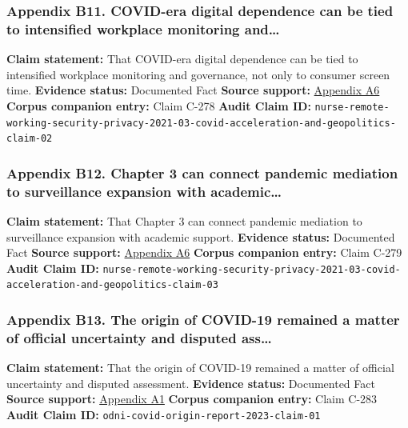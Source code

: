 \documentclass[
  american,
  11pt,
  letterpaper,
]{article}
\begin{document}
\subsubsection{Appendix B11. COVID-era digital dependence can be tied to
intensified workplace monitoring
and\ldots{}}\label{ch-03-appendix-b11-covid-era-digital-dependence-can-be-tied-to-intensified-workplace-monitoring-and}

\textbf{Claim statement:} That COVID-era digital dependence can be tied
to intensified workplace monitoring and governance, not only to consumer
screen time. \textbf{Evidence status:} Documented Fact \textbf{Source
support:}
\hyperref[ch-03-appendix-a6-remote-working-pre-and-post-covid-19-an-analysis-of-new-threats-and-risks-to-security-and-privacy]{Appendix
A6} \textbf{Corpus companion entry:} Claim C-278 \textbf{Audit Claim
ID:}
\texttt{nurse-remote-working-security-privacy-2021-03-covid-acceleration-and-geopolitics-claim-02}

\subsubsection{Appendix B12. Chapter 3 can connect pandemic mediation to
surveillance expansion with
academic\ldots{}}\label{ch-03-appendix-b12-chapter-3-can-connect-pandemic-mediation-to-surveillance-expansion-with-academic}

\textbf{Claim statement:} That Chapter 3 can connect pandemic mediation
to surveillance expansion with academic support. \textbf{Evidence
status:} Documented Fact \textbf{Source support:}
\hyperref[ch-03-appendix-a6-remote-working-pre-and-post-covid-19-an-analysis-of-new-threats-and-risks-to-security-and-privacy]{Appendix
A6} \textbf{Corpus companion entry:} Claim C-279 \textbf{Audit Claim
ID:}
\texttt{nurse-remote-working-security-privacy-2021-03-covid-acceleration-and-geopolitics-claim-03}

\subsubsection{Appendix B13. The origin of COVID-19 remained a matter of
official uncertainty and disputed
ass\ldots{}}\label{ch-03-appendix-b13-the-origin-of-covid-19-remained-a-matter-of-official-uncertainty-and-disputed-ass}

\textbf{Claim statement:} That the origin of COVID-19 remained a matter
of official uncertainty and disputed assessment. \textbf{Evidence
status:} Documented Fact \textbf{Source support:}
\hyperref[ch-03-appendix-a1-report-on-potential-links-between-the-wuhan-institute-of-virology-and-the-origins-of-covid-19]{Appendix
A1} \textbf{Corpus companion entry:} Claim C-283 \textbf{Audit Claim
ID:} \texttt{odni-covid-origin-report-2023-claim-01}
\end{document}
